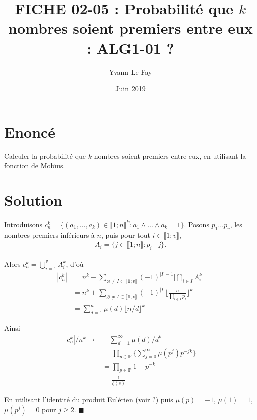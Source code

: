 \documentclass{article}
\newcommand*{\QED}{\hfill\ensuremath{\blacksquare}}%
\begin{document}
\title{FICHE 02-05 : Probabilité que $k$ nombres soient premiers entre eux : ALG1-01 ?}
\author{Yvann Le Fay}
\date{Juin 2019}
\maketitle

\section*{Enoncé}
Calculer la probabilité que $k$ nombres soient premiers entre-eux, en utilisant la fonction de Mobïus.
\section*{Solution}
Introduisons $c_n^k = \{(a_1,\ldots,a_k)\in\llbracket 1;n\rrbracket ^k : a_1 \wedge \ldots \wedge a_k = 1\}$.
Posons $p_1\ldots p_v$, les nombres premiers inférieurs à $n$, puis pour tout $i\in\llbracket 1;v\rrbracket$,
\begin{align*}
A_i = \{j\in\llbracket 1;n\rrbracket : p_i \mid j\}.
\end{align*}

Alors $c_n^k = \overline{\bigcup_{i=1}^{v}A_i^k}$, d'où
\begin{align*}
|c_n^k| &= n^k -\sum_{\varnothing\neq I\subset \llbracket 1;v\rrbracket}(-1)^{|I|-1}\bigg|\bigcap_{i\in I}{A_i^k}\bigg|\\
&= n^k+\sum_{\varnothing\neq I\subset \llbracket 1;v\rrbracket}(-1)^{|I|}\bigg \lfloor \frac{n}{\prod_{i\in I}p_i}\bigg\rfloor^k \\
&= \sum_{d=1}^n \mu(d)\lfloor n/d\rfloor^k 
\end{align*}

Ainsi \begin{align*}
|c_n^k|/n^k \longrightarrow &\quad \sum_{d=1}^{\infty}{\mu(d)/d^k}\\
& = \prod_{p\in \mathbb{P}}\bigg\{\sum_{j=0}^{\infty}\mu(p^j)p^{-jk}\bigg\}\\
& = \prod_{p\in \mathbb{P}}1-p^{-k} \\ &= \frac{1}{\zeta(s)}
\end{align*}

En utilisant l'identité du produit Eulérien (voir ?) puis $\mu(p) = -1$, $\mu(1) = 1$, $\mu(p^j) = 0$ pour $j\geq 2$.
\QED
\end{document}
